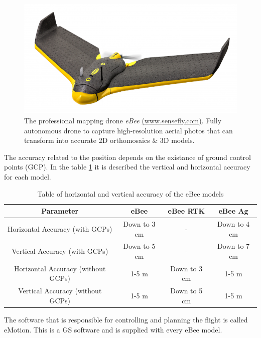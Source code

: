 \begin{figure}[H]
  \centering
  \includegraphics[scale=0.45]{figures/eBee.png}
  \caption[The professional mapping drone eBee]
   {The professional mapping drone \textit{eBee} \href{https://www.sensefly.com/drones/ebee.html}{(www.sensefly.com)}. Fully autonomous drone to capture high-resolution aerial photos that can transform into accurate 2D orthomosaics \& 3D models.}
   \label{fig:ebee}
\end{figure}

The accuracy related to the position depends on the existance of ground control points (GCP). In the table \ref{accuracy} it is described the vertical and horizontal accuracy for each model.

\begin{table}[h!]
	\centering
	\begin{tabular}{|c||c|c|c|}
		\hline
		Parameter & eBee & eBee RTK & eBee Ag\\ \hline\hline
		Horizontal Accuracy (with GCPs) & Down to 3 cm & - & Down to 4 cm\\ \hline
		Vertical Accuracy (with GCPs) & Down to 5 cm & - & Down to 7 cm\\ \hline
		Horizontal Accuracy (without GCPs) & 1-5 m & Down to 3 cm & 1-5 m\\ \hline
		Vertical Accuracy (without GCPs) & 1-5 m & Down to 5 cm & 1-5 m\\ \hline
	\end{tabular}
	\caption{Table of horizontal and vertical accuracy of the eBee models}
	\label{accuracy}
\end{table}

The software that is responsible for controlling and planning the flight is called eMotion. This is a GS software and is supplied with every eBee model.